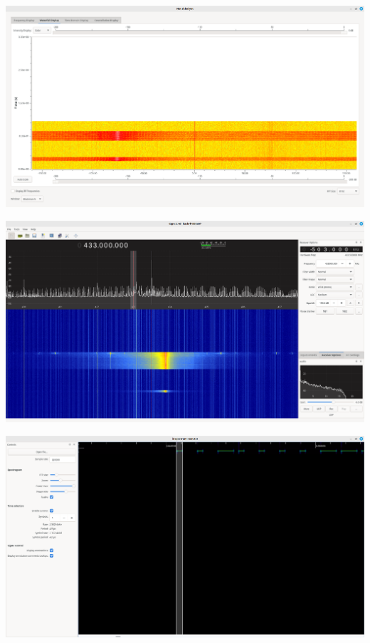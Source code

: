 \documentclass{beamer}
\begin{document}
\begin{frame}
\includegraphics[width=\textwidth]{../Pics/screenshots/gnu_radio_results.png}
\end{frame}

\begin{frame}
\includegraphics[width=\textwidth]{../Pics/screenshots/gqrx-results.png}
\end{frame}

\begin{frame}
\includegraphics[width=\textwidth]{../Pics/screenshots/inspectrum-1.png}
\end{frame}
\end{document}
